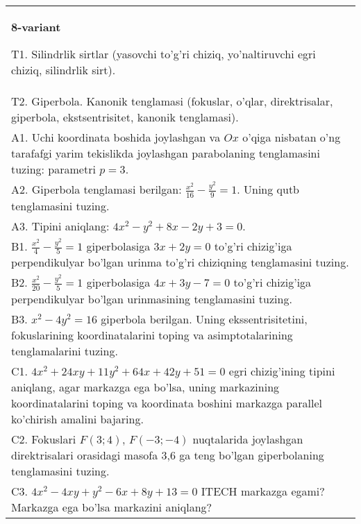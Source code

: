 \documentclass{article}
\begin{document}
\begin{tabular}{m{17cm}}
\textbf{8-variant}
\newline

T1. Silindrlik sirtlar (yasovchi to'g'ri chiziq, yo'naltiruvchi egri chiziq, silindrlik sirt).\\

T2. Giperbola. Kanonik tenglamasi (fokuslar, o'qlar, direktrisalar, giperbola, ekstsentrisitet, kanonik tenglamasi).\\

A1. Uchi koordinata boshida joylashgan va $Ox$ o'qiga nisbatan o'ng tarafafgi yarim tekislikda joylashgan parabolaning tenglamasini tuzing: parametri $p=3$.\\

A2. Giperbola tenglamasi berilgan: $\frac{x^{2}}{16}-\frac{y^{2}}{9}=1$. Uning qutb tenglamasini tuzing.\\

A3. Tipini aniqlang: $4x^{2}-y^{2}+8x-2y+3=0$.\\

B1. $\frac{x^{2}}{4} - \frac{y^{2}}{5} = 1$ giperbolasiga $3x + 2y = 0$ to'g'ri chizig'iga perpendikulyar bo'lgan urinma to'g'ri chiziqning tenglamasini tuzing.\\

B2. $\frac{x^{2}}{20} - \frac{y^{2}}{5} = 1$ giperbolasiga $4x + 3y - 7 = 0$ to'g'ri chizig'iga perpendikulyar bo'lgan urinmasining tenglamasini tuzing.  \\

B3. $x^{2} - 4y^{2} = 16$ giperbola berilgan. Uning ekssentrisitetini, fokuslarining koordinatalarini toping va asimptotalarining tenglamalarini tuzing.\\

C1. $4x^{2} + 24xy + 11y^{2} + 64x + 42y + 51 = 0$ egri chizig'ining tipini aniqlang, agar markazga ega bo'lsa, uning markazining koordinatalarini toping va koordinata boshini markazga parallel ko'chirish amalini bajaring.\\

C2. Fokuslari $F(3;4)$, $F(-3;-4)$ nuqtalarida joylashgan direktrisalari orasidagi masofa 3,6 ga teng bo'lgan giperbolaning tenglamasini tuzing.  \\

C3. $4x^{2} - 4xy + y^{2} - 6x + 8y + 13 = 0$ ITECH markazga egami? Markazga ega bo'lsa markazini aniqlang?  \\

\end{tabular}
\vspace{1cm}
\end{document}
